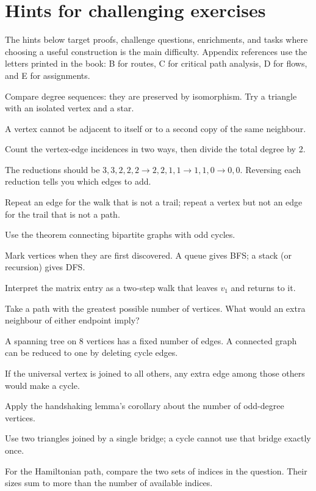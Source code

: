 \chapter*{Hints for challenging exercises}
The hints below target proofs, challenge questions, enrichments, and tasks where choosing a useful construction is the main difficulty. Appendix references use the letters printed in the book: B for routes, C for critical path analysis, D for flows, and E for assignments.
\begin{description}[style=nextline]
\item[1.3] Compare degree sequences: they are preserved by isomorphism. Try a triangle with an isolated vertex and a star.
\item[2.1] A vertex cannot be adjacent to itself or to a second copy of the same neighbour.
\item[2.5] Count the vertex-edge incidences in two ways, then divide the total degree by 2.
\item[2.6] The reductions should be $3,3,2,2,2\to2,2,1,1\to1,1,0\to0,0$. Reversing each reduction tells you which edges to add.
\item[3.1] Repeat an edge for the walk that is not a trail; repeat a vertex but not an edge for the trail that is not a path.
\item[3.2] Use the theorem connecting bipartite graphs with odd cycles.
\item[3.4] Mark vertices when they are first discovered. A queue gives BFS; a stack (or recursion) gives DFS.
\item[4.2] Interpret the matrix entry as a two-step walk that leaves $v_1$ and returns to it.
\item[5.2] Take a path with the greatest possible number of vertices. What would an extra neighbour of either endpoint imply?
\item[5.3] A spanning tree on 8 vertices has a fixed number of edges. A connected graph can be reduced to one by deleting cycle edges.
\item[5.4] If the universal vertex is joined to all others, any extra edge among those others would make a cycle.
\item[6.1] Apply the handshaking lemma's corollary about the number of odd-degree vertices.
\item[6.4] Use two triangles joined by a single bridge; a cycle cannot use that bridge exactly once.
\item[6.5] For the Hamiltonian path, compare the two sets of indices in the question. Their sizes sum to more than the number of available indices.

\end{description}
